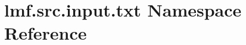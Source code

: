 \hypertarget{namespacelmf_1_1src_1_1input_1_1txt}{\section{lmf.\+src.\+input.\+txt Namespace Reference}
\label{namespacelmf_1_1src_1_1input_1_1txt}
}
